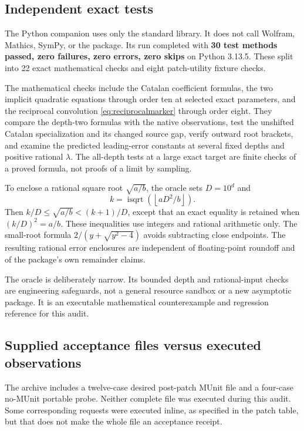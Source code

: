 \documentclass[11pt,letterpaper]{article}
\theoremstyle{remark}\newtheorem{remark}[theorem]{Remark}
\begin{document}
\subsection{Independent exact tests}
The Python companion uses only the standard library. It does not call Wolfram,
Mathics, SymPy, or the package. Its run completed with \textbf{30 test methods
passed, zero failures, zero errors, zero skips} on Python 3.13.5. These split
into 22 exact mathematical checks and eight patch-utility fixture checks.

The mathematical checks include the Catalan coefficient formulas, the two
implicit quadratic equations through order ten at selected exact parameters,
and the reciprocal convolution \eqref{eq:reciprocalmarker} through order
eight. They compare the depth-two formulas with the native observations, test
the unshifted Catalan specialization and its changed source gap, verify
outward root brackets, and examine the predicted leading-error constants at
several fixed depths and positive rational $\lambda$. The all-depth tests at a
large exact target are finite checks of a proved formula, not proofs of a
limit by sampling.

To enclose a rational square root $\sqrt{a/b}$, the oracle sets $D=10^d$ and
\[
 k=\operatorname{isqrt}\!\left(\left\lfloor aD^2/b\right\rfloor\right).
\]
Then $k/D\leq\sqrt{a/b}<(k+1)/D$, except that an exact equality is retained when
$(k/D)^2=a/b$. These inequalities use integers and rational arithmetic only.
The small-root formula $2/(y+\sqrt{y^2-4})$ avoids subtracting close endpoints.
The resulting rational error enclosures are independent of floating-point
roundoff and of the package's own remainder claims.

The oracle is deliberately narrow. Its bounded depth and rational-input
checks are engineering safeguards, not a general resource sandbox or a new
asymptotic package. It is an executable mathematical counterexample and
regression reference for this audit.

\subsection{Supplied acceptance files versus executed observations}
The archive includes a twelve-case desired post-patch MUnit file and a
four-case no-MUnit portable probe. Neither complete file was executed during
this audit. Some corresponding requests were executed inline, as specified in
the patch table, but that does not make the whole file an acceptance receipt.
\end{document}
